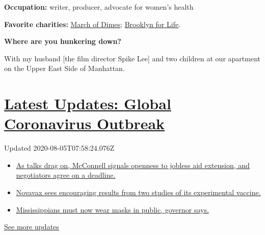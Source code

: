 \textbf{Occupation:} writer, producer, advocate for women's health

\textbf{Favorite charities:}
\href{https://www.marchofdimes.org/giving/support-general.aspx?\&utm_source=google\&utm_medium=cpc\&utm_campaign=alwayson\&utm_content=nonbrand\&utm_term=march\%20of\%20dimes\%20website\&DonationTrackingParam1=alwayson_google\&gclid=EAIaIQobChMI7oXbnKXF6QIVA4vICh1rKA6bEAAYASAAEgJDSPD_BwE\&gclsrc=aw.ds}{March
of Dimes}; \href{https://www.brooklynforlife.org}{Brooklyn for Life}.

\textbf{Where are you hunkering down?}

With my husband {[}the film director Spike Lee{]} and two children at
our apartment on the Upper East Side of Manhattan.

\hypertarget{latest-updates-global-coronavirus-outbreak}{%
\section{\texorpdfstring{\href{https://www.nytimes.com/2020/08/04/world/coronavirus-cases.html?action=click\&pgtype=Article\&state=default\&region=MAIN_CONTENT_1\&context=storylines_live_updates}{Latest
Updates: Global Coronavirus
Outbreak}}{Latest Updates: Global Coronavirus Outbreak}}\label{latest-updates-global-coronavirus-outbreak}}

Updated 2020-08-05T07:58:24.076Z

\begin{itemize}
\tightlist
\item
  \href{https://www.nytimes.com/2020/08/04/world/coronavirus-cases.html?action=click\&pgtype=Article\&state=default\&region=MAIN_CONTENT_1\&context=storylines_live_updates\#link-762df92}{As
  talks drag on, McConnell signals openness to jobless aid extension,
  and negotiators agree on a deadline.}
\item
  \href{https://www.nytimes.com/2020/08/04/world/coronavirus-cases.html?action=click\&pgtype=Article\&state=default\&region=MAIN_CONTENT_1\&context=storylines_live_updates\#link-1228a480}{Novavax
  sees encouraging results from two studies of its experimental
  vaccine.}
\item
  \href{https://www.nytimes.com/2020/08/04/world/coronavirus-cases.html?action=click\&pgtype=Article\&state=default\&region=MAIN_CONTENT_1\&context=storylines_live_updates\#link-794484ed}{Mississippians
  must now wear masks in public, governor says.}
\end{itemize}

\href{https://www.nytimes.com/2020/08/04/world/coronavirus-cases.html?action=click\&pgtype=Article\&state=default\&region=MAIN_CONTENT_1\&context=storylines_live_updates}{See
more updates}

